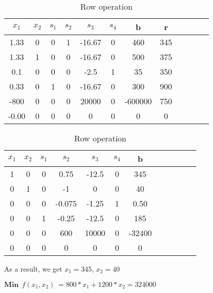 \documentclass{article}
\begin{document}
  \begin{table}[H]
  \centering
  \caption{Row operation}
  \begin{tabular}{|c|c|c|c|c|c|c|c|c|c|c|c|}
  \hline
  $x_1$ & $x_2$ & $s_1$  & $s_2$ & $s_3$ & $s_4$ & b & r  \\ \hline
  1.33    & 0      & 0       & 1       & -16.67    & 0    & 460  & \cellcolor{yellow}345\\ \hline
  1.33    & 1      & 0       & 0       & -16.67    & 0    & 500  & 375\\ \hline
  0.1     & 0      & 0       & 0       & -2.5      & 1     & 35      & 350\\ \hline
  0.33    & 0      & 1       & 0       & -16.67    & 0    & 300  & 900\\ \hline
  -800    & 0      & 0       & 0       & 20000    & 0    & -600000 & 750\\ \hline
  \cellcolor{green}-0.00   & 0      & 0       & 0       & 0    & 0    & 0     & 0\\ \hline
  \end{tabular}
  \end{table}

  \begin{table}[H]
  \centering
  \caption{Row operation}
  \begin{tabular}{|c|c|c|c|c|c|c|c|c|c|c|c|}
  \hline
  $x_1$ & $x_2$ & $s_1$  & $s_2$ & $s_3$ & $s_4$ & b \\ \hline
  1    & 0      & 0       & 0.75   & -12.5  & 0    & \cellcolor{red}345 \\ \hline
  0    & 1      & 0       & -1     & 0      & 0    & \cellcolor{red}40  \\ \hline
  0    & 0      & 0       & -0.075 & -1.25  & 1    & 0.50  \\ \hline
  0    & 0      & 1       & -0.25  & -12.5  & 0    & 185  \\ \hline
  0    & 0      & 0       & 600    & 10000  & 0    & -32400 \\ \hline
  0    & 0      & 0       & 0      & 0      & 0     & 0     \\ \hline
  \end{tabular}
  \end{table}

  As a result, we get $x_1=345$, $x_2=40$

  $\textbf{Min}\:\: f(x_1,x_2) \: = 800*x_1 + 1200*x_2 = 324000$
\end{document}
